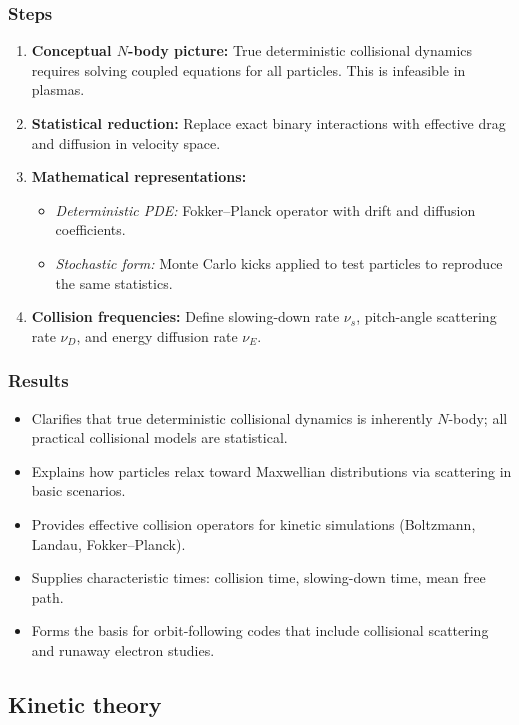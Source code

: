 \documentclass[10pt]{book}
\begin{document}
\subsubsection{Steps}
\begin{enumerate}
    \item \textbf{Conceptual $N$-body picture:} True deterministic collisional dynamics requires solving coupled equations for all particles. 
    This is infeasible in plasmas.
    \item \textbf{Statistical reduction:} Replace exact binary interactions with effective drag and diffusion in velocity space.  
    \item \textbf{Mathematical representations:}
    \begin{itemize}
        \item \emph{Deterministic PDE:} Fokker--Planck operator with drift and diffusion coefficients.
        \item \emph{Stochastic form:} Monte Carlo kicks applied to test particles to reproduce the same statistics.
    \end{itemize}
    \item \textbf{Collision frequencies:} Define slowing-down rate $\nu_s$, pitch-angle scattering rate $\nu_D$, and energy diffusion rate $\nu_E$.
\end{enumerate}

\subsubsection{Results}
\begin{itemize}
    \item Clarifies that true deterministic collisional dynamics is inherently $N$-body; all practical collisional models are statistical.  
    \item Explains how particles relax toward Maxwellian distributions via scattering in basic scenarios.  
    \item Provides effective collision operators for kinetic simulations (Boltzmann, Landau, Fokker--Planck).  
    \item Supplies characteristic times: collision time, slowing-down time, mean free path.  
    \item Forms the basis for orbit-following codes that include collisional scattering and runaway electron studies.  
\end{itemize}




\subsection{Kinetic theory}
\label{subsec:kinetic_theory}
\end{document}

